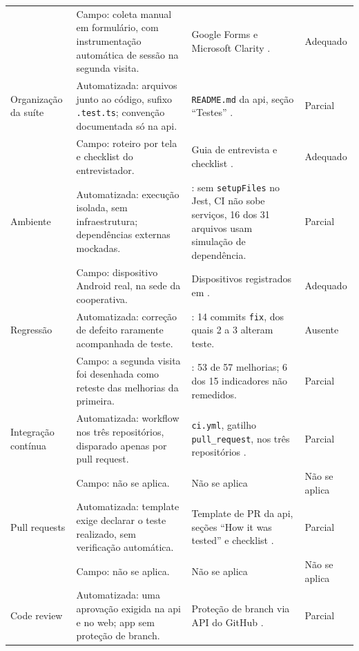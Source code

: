 {\begin{longtable}{>{\raggedright\arraybackslash}p{2.1cm} >{\raggedright\arraybackslash}p{4.3cm} >{\raggedright\arraybackslash}p{4.4cm} >{\raggedright\arraybackslash}p{1.6cm}}
& Campo: coleta manual em formulário, com instrumentação automática de sessão na segunda visita.
& Google Forms e Microsoft Clarity \cite[p.~16]{psp5}.
& Adequado
\\
\addlinespace
Organização da suíte
& Automatizada: arquivos junto ao código, sufixo \texttt{.test.ts}; convenção documentada só na api.
& \texttt{README.md} da api, seção ``Testes'' \cite{educado-repos}.
& Parcial
\\[0.1cm]

& Campo: roteiro por tela e checklist do entrevistador.
& Guia de entrevista e checklist \cite[p.~12]{psp5}.
& Adequado
\\
\addlinespace
Ambiente
& Automatizada: execução isolada, sem infraestrutura; dependências externas mockadas.
& \cite{educado-repos}: sem \texttt{setupFiles} no Jest, CI não sobe serviços, 16 dos 31 arquivos usam simulação de dependência.
& Parcial
\\[0.1cm]

& Campo: dispositivo Android real, na sede da cooperativa.
& Dispositivos registrados em \cite{dashboard}.
& Adequado
\\
\addlinespace
Regressão
& Automatizada: correção de defeito raramente acompanhada de teste.
& \cite{educado-repos}: 14 commits \texttt{fix}, dos quais 2 a 3 alteram teste.
& Ausente
\\[0.1cm]

& Campo: a segunda visita foi desenhada como reteste das melhorias da primeira.
& \cite[p.~10]{psp5}: 53 de 57 melhorias; 6 dos 15 indicadores não remedidos.
& Parcial
\\
\addlinespace
Integração contínua
& Automatizada: workflow nos três repositórios, disparado apenas por pull request.
& \texttt{ci.yml}, gatilho \texttt{pull\_request}, nos três repositórios \cite{educado-repos}.
& Parcial
\\[0.1cm]

& Campo: não se aplica.
& Não se aplica
& Não se aplica
\\
\addlinespace
Pull requests
& Automatizada: template exige declarar o teste realizado, sem verificação automática.
& Template de PR da api, seções ``How it was tested'' e checklist \cite{educado-repos}.
& Parcial
\\[0.1cm]

& Campo: não se aplica.
& Não se aplica
& Não se aplica
\\
\addlinespace
Code review
& Automatizada: uma aprovação exigida na api e no web; app sem proteção de branch.
& Proteção de branch via API do GitHub \cite{educado-repos}.
& Parcial
\\[0.1cm]


\end{longtable}}
